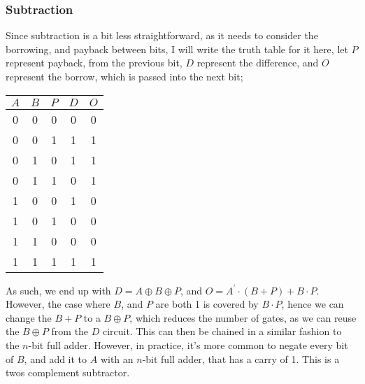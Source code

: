 \documentclass[a4paper, 12pt]{article}
\begin{document}
            \subsubsection*{Subtraction}
                Since subtraction is a bit less straightforward, as it needs to consider the borrowing, and payback between bits, I will write the truth table for it here, let $P$ represent payback, from the previous bit, $D$ represent the difference, and $O$ represent the borrow, which is passed into the next bit;
                \begin{center}
                    \begin{tabular}{c|c|c||c|c}
                        $A$ & $B$ & $P$ & $D$ & $O$ \\
                        \hline
                        0 & 0 & 0 & 0 & 0 \\
                        0 & 0 & 1 & 1 & 1 \\
                        0 & 1 & 0 & 1 & 1 \\
                        0 & 1 & 1 & 0 & 1 \\
                        1 & 0 & 0 & 1 & 0 \\
                        1 & 0 & 1 & 0 & 0 \\
                        1 & 1 & 0 & 0 & 0 \\
                        1 & 1 & 1 & 1 & 1 \\
                    \end{tabular}
                \end{center}
                As such, we end up with $D = A \oplus B \oplus P$, and $O = A^\prime \cdot (B + P) + B \cdot P$. However, the case where $B$, and $P$ are both 1 is covered by $B \cdot P$, hence we can change the $B + P$ to a $B \oplus P$, which reduces the number of gates, as we can reuse the $B \oplus P$ from the $D$ circuit. This can then be chained in a similar fashion to the $n$-bit full adder. However, in practice, it's more common to negate every bit of $B$, and add it to $A$ with an $n$-bit full adder, that has a carry of 1. This is a twos complement subtractor.
\end{document}
